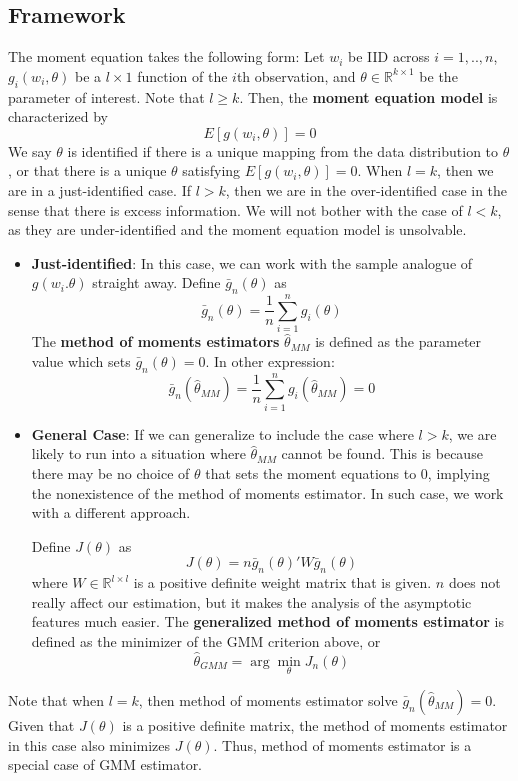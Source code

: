\documentclass[12pt]{article}
\theoremstyle{definition}
\theoremstyle{property}
\theoremstyle{assumption}
\theoremstyle{example}
\theoremstyle{comment}
\begin{document}
\subsection{Framework}
The moment equation takes the following form: Let $w_i$ be IID across $i=1,..,n$,  $g_i(w_i, \theta)$ be a $l\times1$ function of the $i$th observation, and $\theta\in\mathbb{R}^{k\times1}$ be the parameter of interest.  Note that $l\geq k$. Then, the \textbf{moment equation model} is characterized by
\[
E[g(w_i,\theta)]=0
\]
 We say $\theta$ is identified if there is a unique mapping from the data distribution to $\theta$, or that there is a unique $\theta$ satisfying $E[g(w_i,\theta)]=0$. When $l=k$, then we are in a just-identified case. If $l>k$, then we are in the over-identified case in the sense that there is excess information. We will not bother with the case of $l<k$, as they are under-identified and the moment equation model is unsolvable. \par
\begin{itemize}
\item \textbf{Just-identified}: In this case, we can work with the sample analogue of $g(w_i.\theta)$ straight away. Define $\bar{g}_n(\theta)$ as 
\[
\bar{g}_n(\theta)=\frac{1}{n}\sum_{i=1}^ng_i(\theta)
\]
The \textbf{method of moments estimators} $\hat{\theta}_{MM}$ is defined as the parameter value which sets $\bar{g}_n(\theta)=0$. In other expression:
\[
\bar{g}_n(\hat{\theta}_{MM})=\frac{1}{n}\sum_{i=1}^ng_i(\hat{\theta}_{MM})=0
\] 
\item \textbf{General Case}: If we can generalize to include the case where $l>k$, we are likely to run into a situation where $\hat{\theta}_{MM}$ cannot be found. This is because there may be no choice of $\theta$ that sets the moment equations to 0, implying the nonexistence of the method of moments estimator. In such case, we work with a different approach. 
\par
Define $J(\theta)$ as
\[
J(\theta)=n \bar{g}_n(\theta)'W\bar{g}_n(\theta)
\]
where $W\in\mathbb{R}^{l\times l}$ is a positive definite weight matrix that is given. $n$ does not really affect our estimation, but it makes the analysis of the asymptotic features much easier. The \textbf{generalized method of moments estimator} is defined as the minimizer of the GMM criterion above, or
\[
\hat{\theta}_{GMM}=\arg\min_\theta J_n(\theta)
\]
\end{itemize}\par
Note that when $l=k$, then method of moments estimator solve $\bar{g}_n(\hat{\theta}_{MM})=0$. Given that $J(\theta)$ is a positive definite matrix, the method of moments estimator in this case also minimizes $J(\theta)$. Thus, method of moments estimator is a special case of GMM estimator. \par
\end{document}
